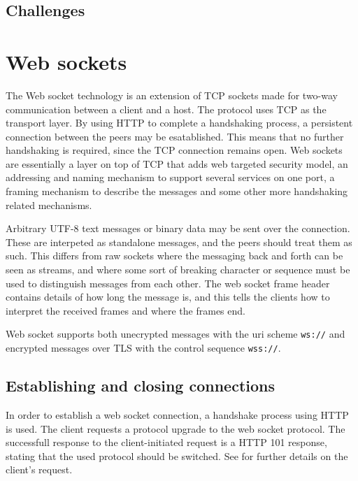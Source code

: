 \subsection{Challenges}

\section{Web sockets}

The Web socket technology is an extension of TCP sockets made for two-way communication between a client and a host. The protocol uses TCP \cite{postel1981transmission} as the transport layer. By using HTTP to complete a handshaking process, a persistent connection between the peers may be esatablished. This means that no further handshaking is required, since the TCP connection remains open. Web sockets are essentially a layer on top of TCP that adds web targeted security model, an addressing and naming mechanism to support several services on one port, a framing mechanism to describe the messages and some other more handshaking related mechanisms. \cite{fette2011websocket}

Arbitrary UTF-8 \cite{RFC3629} text messages or binary data may be sent over the connection. These are interpeted as standalone messages, and the peers should treat them as such. This differs from raw sockets where the messaging back and forth can be seen as streams, and where some sort of breaking character or sequence must be used to distinguish messages from each other. The web socket frame header contains details of how long the message is, and this tells the clients how to interpret the received frames and where the frames end.

Web socket supports both unecrypted messages with the uri scheme \texttt{ws://} and encrypted messages over TLS \cite{RFC5246} with the control sequence \texttt{wss://}.

\subsection{Establishing and closing connections}

In order to establish a web socket connection, a handshake process using HTTP is used. The client requests a protocol upgrade to the web socket protocol. The successfull response to the client-initiated request is a HTTP 101 response, stating that the used protocol should be switched. \cite[section 10.1.2]{RFC2616} See \cite{RFC2616} for further details on the client's request.

